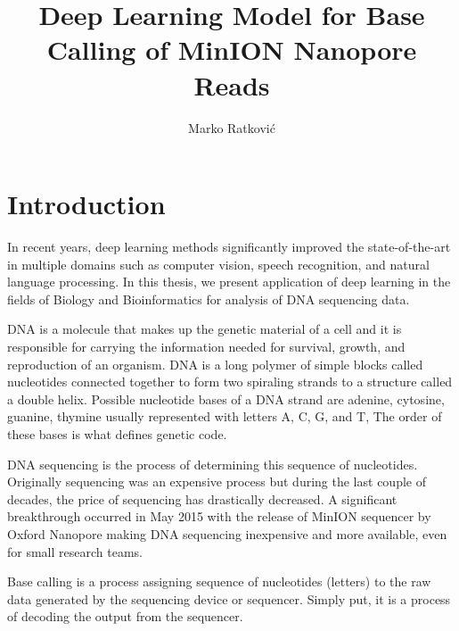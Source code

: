 \documentclass[times, utf8, diplomski, numeric, english]{fer}
\begin{document}
\title{Deep Learning Model for Base Calling of MinION Nanopore Reads}
\author{Marko Ratković}

\maketitle

\izvornik


\tableofcontents
\listoffigures
\listoftables

\chapter{Introduction}

In recent years,  deep learning methods significantly improved the state-of-the-art in multiple domains such as computer vision, speech recognition, and natural language processing\cite{LeCun:1998:CNI:303568.303704}\cite{NIPS2012_4824}. 
In this thesis, we present application of deep learning in the fields of Biology and Bioinformatics for analysis of DNA sequencing data. 

DNA is a molecule that makes up the genetic material of a cell and it is responsible for carrying the information needed for survival, growth, and reproduction of an organism. 
DNA is a long polymer of simple blocks called nucleotides connected together to form two spiraling strands to a structure called a double helix.  Possible nucleotide bases of a DNA strand are adenine, cytosine, guanine, thymine usually represented with letters A, C, G, and T,   The order of these bases is what defines genetic code.

DNA sequencing is the process of determining this sequence of nucleotides. Originally sequencing was an expensive process but during the last couple of decades, the price of sequencing has drastically decreased.  A significant breakthrough occurred in May 2015 with the release of MinION sequencer by Oxford Nanopore making DNA sequencing inexpensive and more available, even for small research teams. 

Base calling is a process assigning sequence of nucleotides (letters) to the raw data generated by the sequencing device or sequencer. Simply put, it is a process of decoding the output from the sequencer.
\end{document}
